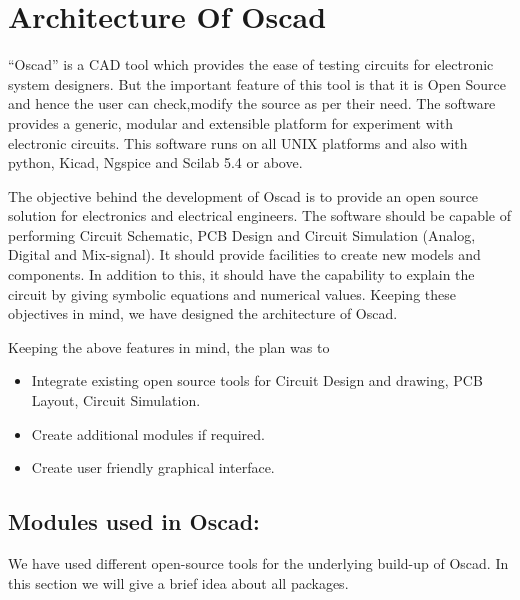 
\chapter {Architecture Of Oscad}

“Oscad” is a CAD tool which provides the ease of testing circuits for electronic system designers. But the important feature of this tool is that it is Open Source and hence the user can check,modify the source as per their need. The software provides a generic, modular and extensible platform for experiment with electronic circuits. This software runs on all UNIX platforms and also with python, Kicad, Ngspice and Scilab 5.4 or above.

The objective behind the development of Oscad is to provide an open source solution for electronics and electrical engineers. The software should be capable of performing Circuit Schematic, PCB Design and Circuit Simulation (Analog, Digital and Mix-signal). It should provide facilities to create new models and components. In addition to this, it should have the capability to explain the circuit by giving symbolic equations and numerical values. Keeping these objectives in mind, we have designed the architecture of Oscad.


Keeping the above features in mind, the plan was to
\begin{itemize}
\item Integrate existing open source tools for Circuit Design and drawing, PCB Layout, Circuit Simulation.
\item Create additional modules if required.
\item Create user friendly graphical interface.
\end{itemize} 



\section {Modules used in Oscad:}
We have used different open-source tools for the underlying build-up of Oscad. In this section we will give a brief idea about all packages. 

